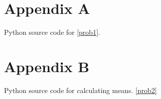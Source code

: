 \documentclass[a4paper,11pt]{article}
\begin{document}
\section{Appendix A}\label{code:problem1}
Python source code for \ref{prob1}.

\section{Appendix B}\label{code:problem2}
Python source code for calculating means. \ref{prob2}

\end{document}
